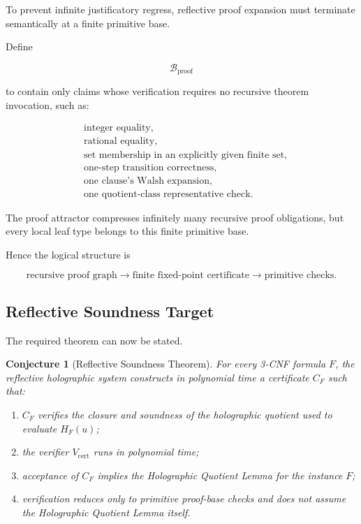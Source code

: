 \documentclass[11pt]{article}
\theoremstyle{plain}
\newtheorem{conjecture}[theorem]{Conjecture}
\theoremstyle{definition}
\begin{document}
To prevent infinite justificatory regress, reflective proof expansion must
terminate semantically at a finite primitive base.

Define

\[
    \mathcal{B}_{\mathrm{proof}}
\]

to contain only claims whose verification requires no recursive theorem
invocation, such as:

\[
\begin{aligned}
&\text{integer equality},\\
&\text{rational equality},\\
&\text{set membership in an explicitly given finite set},\\
&\text{one-step transition correctness},\\
&\text{one clause's Walsh expansion},\\
&\text{one quotient-class representative check}.
\end{aligned}
\]

The proof attractor compresses infinitely many recursive proof obligations,
but every local leaf type belongs to this finite primitive base.

Hence the logical structure is

\[
\boxed{
\text{recursive proof graph}
\longrightarrow
\text{finite fixed-point certificate}
\longrightarrow
\text{primitive checks}.
}
\]

\subsection{Reflective Soundness Target}

The required theorem can now be stated.

\begin{conjecture}[Reflective Soundness Theorem]
\label{conj:reflective-soundness}
For every 3-CNF formula \(F\), the reflective holographic system constructs
in polynomial time a certificate \(C_F\) such that:

\begin{enumerate}
    \item \(C_F\) verifies the closure and soundness of the holographic
    quotient used to evaluate \(H_F(u)\);

    \item the verifier \(V_{\mathrm{cert}}\) runs in polynomial time;

    \item acceptance of \(C_F\) implies the Holographic Quotient Lemma for
    the instance \(F\);

    \item verification reduces only to primitive proof-base checks and does
    not assume the Holographic Quotient Lemma itself.
\end{enumerate}
\end{conjecture}
\end{document}
